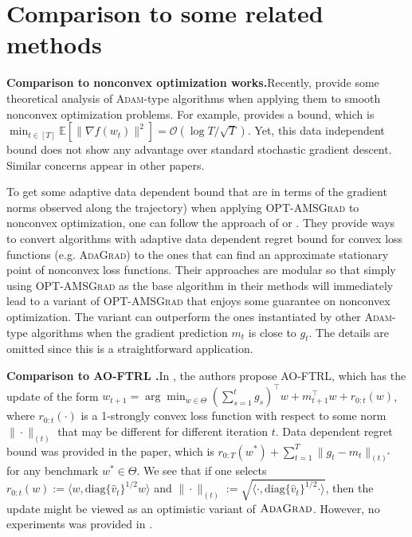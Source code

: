 \documentclass[11pt]{article}
\theoremstyle{k}
\begin{document}
\newpage

\section{Comparison to some related methods} \label{app:related}

\textbf{Comparison to nonconvex optimization works.}\hspace{0.1in}Recently, \citep{ZRSKK18,CLSH19,WWB18,ZTYCG18,ZS18,LO18} provide some theoretical analysis 
of \textsc{Adam}-type algorithms when applying them to smooth nonconvex optimization problems.
For example, \citep{CLSH19} provides a bound,
which is $\min_{t \in [T]} \mathbb{E}[\| \nabla f(w_t) \|^2 ] = \mathcal{O}(\log T / \sqrt{T}) $.
Yet, this data independent bound does not show any advantage over standard stochastic gradient descent. Similar concerns appear in other papers.

To get some adaptive data dependent bound that are in terms of the gradient norms observed along the trajectory) when applying 
\textsc{OPT-AMSGrad} to nonconvex optimization,
one can follow the approach of \citep{Princeton18} or \citep{CYYZC19}.
They provide ways to convert algorithms with adaptive data dependent regret bound
for convex loss functions (e.g. \textsc{AdaGrad}) to the ones that can find an approximate stationary point of nonconvex loss functions. 
Their approaches are modular so that simply using \textsc{OPT-AMSGrad}
as the base algorithm in their methods will immediately lead to a variant of \textsc{OPT-AMSGrad} that enjoys some guarantee on nonconvex optimization.
The variant can outperform the ones instantiated by other \textsc{Adam}-type algorithms when
the gradient prediction $m_t$ is close to $g_t$.
The details are omitted since this is a straightforward application.

\textbf{Comparison to AO-FTRL \citep{MY16}.}\hspace{0.1in}In \citep{MY16}, the authors propose AO-FTRL, which has the update of 
the form $w_{t+1} = \arg\min_{{w \in \Theta}} ( \sum_{s=1}^t g_s )^{\top}  w + m_{t+1}^\top w + r_{0:t}(w) $, where $r_{0:t}(\cdot)$ is a 1-strongly convex loss function with respect to some norm $\| \cdot\|_{(t)}$ that may be different for different iteration $t$. 
Data dependent regret bound was provided in the paper, which is $r_{{0:T}}(w^*) + \sum_{t=1}^T \| g_t - m_t \|_{(t)^*}$ for any benchmark $w^{*} \in \Theta$. We see that if
one selects $r_{0:t}(w) := \langle w, \text{diag}\{\hat{v}_t\}^{1/2} w \rangle$ 
and $\| \cdot \|_{(t)}:= 
\sqrt{ \langle \cdot, \text{diag}\{\hat{v}_t\}^{1/2} \cdot \rangle }$, then the update might be viewed as an optimistic variant of $\textsc{AdaGrad}$. However, no experiments was provided in \citep{MY16}. 
\end{document}
